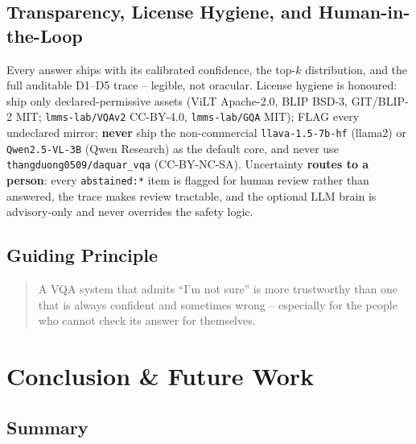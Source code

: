 \documentclass[12pt,a4paper]{article}
\begin{document}
\subsection{Transparency, License Hygiene, and Human-in-the-Loop}

Every answer ships with its calibrated confidence, the top-$k$ distribution, and the full auditable D1--D5 trace -- legible, not oracular. License hygiene is honoured: ship only declared-permissive assets (ViLT Apache-2.0, BLIP BSD-3, GIT/BLIP-2 MIT; \texttt{lmms-lab/VQAv2} CC-BY-4.0, \texttt{lmms-lab/GQA} MIT); FLAG every undeclared mirror; \textbf{never} ship the non-commercial \texttt{llava-1.5-7b-hf} (llama2) or \texttt{Qwen2.5-VL-3B} (Qwen Research) as the default core, and never use \texttt{thangduong0509/daquar\_vqa} (CC-BY-NC-SA). Uncertainty \textbf{routes to a person}: every \texttt{abstained:*} item is flagged for human review rather than answered, the trace makes review tractable, and the optional LLM brain is advisory-only and never overrides the safety logic.

\subsection{Guiding Principle}

\begin{quote}
A VQA system that admits ``I'm not sure'' is more trustworthy than one that is always confident and sometimes wrong -- especially for the people who cannot check its answer for themselves.
\end{quote}

\section{Conclusion \& Future Work}

\subsection{Summary}
\end{document}
